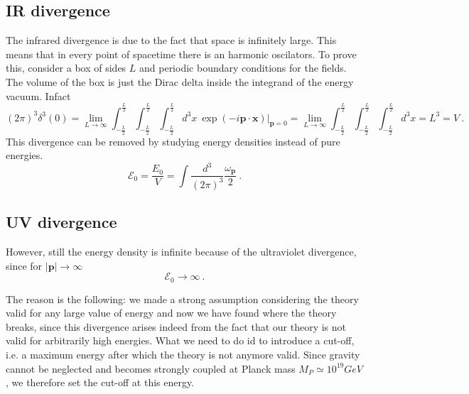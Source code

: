 \subsection{IR divergence}

    The infrared divergence is due to the fact that space is infinitely large. This means that in every point of spacetime there is an harmonic oscilators. To prove this, consider a box of sides $L$ and periodic boundary conditions for the fields. The volume of the box is just the Dirac delta inside the integrand of the energy vacuum. Infact 
    \begin{equation*}
        (2\pi)^3 \delta^3 (0) = \lim_{L \rightarrow \infty} \int_{-\frac{L}{2}}^{\frac{L}{2}} \int_{-\frac{L}{2}}^{\frac{L}{2}} \int_{-\frac{L}{2}}^{\frac{L}{2}} d^3 x ~ \exp(- i \mathbf p \cdot \mathbf x) \Big \vert_{\mathbf p = 0} = \lim_{L \rightarrow \infty} \int_{-\frac{L}{2}}^{\frac{L}{2}} \int_{-\frac{L}{2}}^{\frac{L}{2}} \int_{-\frac{L}{2}}^{\frac{L}{2}} d^3 x = L^3 = V ~.
    \end{equation*}
    This divergence can be removed by studying energy densities instead of pure energies. 
    \begin{equation*}
        \mathcal E_0 = \frac{E_0}{V} = \int \frac{d^3}{(2\pi)^3} \frac{\omega_{\mathbf p}}{2} ~.
    \end{equation*}

\subsection{UV divergence}

    However, still the energy density is infinite because of the ultraviolet divergence, since for $|\mathbf p| \rightarrow \infty$
    \begin{equation*}
        \mathcal E_0 \rightarrow \infty ~.
    \end{equation*}
    
    The reason is the following: we made a strong assumption considering the theory valid for any large value of energy and now we have found where the theory breaks, since this divergence arises indeed from the fact that our theory is not valid for arbitrarily high energies. What we need to do id to introduce a cut-off, i.e. a maximum energy after which the theory is not anymore valid. Since gravity cannot be neglected and becomes strongly coupled at Planck mass $M_P \simeq 10^{19} GeV$, we therefore set the cut-off at this energy. 

